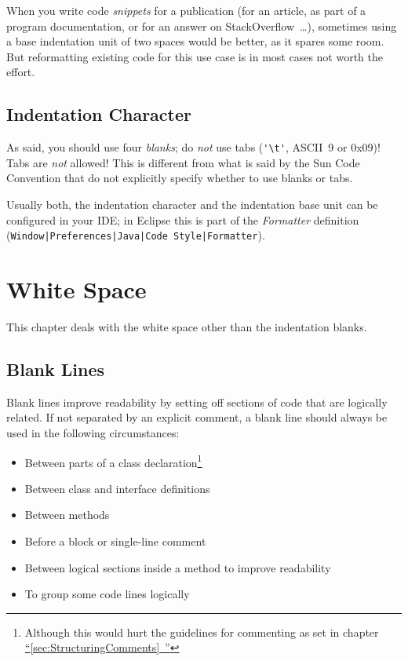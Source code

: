 \documentclass[11pt,a4paper, titlepage, parskip=half, headsepline, footsepline, cleardoublepage=current, headheight=1cm]{scrbook}
\newcommand*{\tqfullref}[1]{\hyperref[{#1}]{“\ref*{#1}~\nameref*{#1}”}}
\begin{document}
When you write code \textit{snippets} for a publication (for an article, as part of a program documentation, or for an answer on StackOverflow\autocite{STACKOVERFLOW}~…), sometimes using a base indentation unit of two spaces would be better, as it spares some room. But reformatting existing code for this use case is in most cases not worth the effort.

\subsection{Indentation Character}\label{sec:IndentationCharacter}
As said, you should use four \textit{blanks}; do \textit{not} use tabs (\lstinline|'\t'|, ASCII~9 or 0x09)! Tabs are \textit{not} allowed! This is different from what is said by the Sun Code Convention\autocite{SUN_CODE_CONVENTIONS:Indentation} that do not explicitly specify whether to use blanks or tabs.

Usually both, the indentation character and the indentation base unit can be configured in your IDE; in Eclipse this is part of the \textit{Formatter} definition (\verb#Window|Preferences|Java|Code Style|Formatter#).


\section{White Space}
This chapter deals with the white space other than the indentation blanks.

\subsection{Blank Lines}\label{sec:BlankLines}
Blank lines improve readability by setting off sections of code that are logically related.
If not separated by an explicit comment, a blank line should always be used in the following circumstances:
\begin{itemize}
\item{Between parts of a class declaration\footnote{Although this would hurt the guidelines for commenting as set in chapter \tqfullref{sec:StructuringComments}}}
\item{Between class and interface definitions}
\item{Between methods}
\item{Before a block or single-line comment}
\item{Between logical sections inside a method to improve readability}
\item{To group some code lines logically}
\end{itemize}
\end{document}
